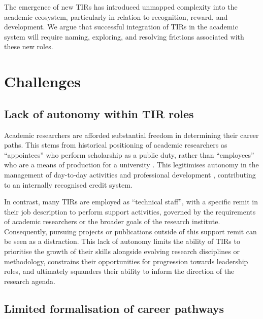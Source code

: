 \documentclass[authordate,meta]{jote-new-article}
\begin{document}
The emergence of new TIRs has introduced unmapped complexity into the academic ecosystem, particularly in relation to recognition, reward, and development. We argue that successful integration of TIRs in the academic system will require naming, exploring, and resolving frictions associated with these new roles.



\section{Challenges}



\subsection{Lack of autonomy within TIR roles}



Academic researchers are afforded substantial freedom in determining their career paths. This stems from historical positioning of academic researchers as “appointees” who perform scholarship as a public duty, rather than “employees” who are a means of production for a university \parencites{Finkin2011}. This legitimises autonomy in the management of day-to-day activities and professional development \parencites{Wolf2021}, contributing to an internally recognised credit system.







In contrast, many TIRs are employed as “technical staff”, with a specific remit in their job description to perform support activities, governed by the requirements of academic researchers or the broader goals of the research institute. Consequently, pursuing projects or publications outside of this support remit can be seen as a distraction. This lack of autonomy limits the ability of TIRs to prioritise the growth of their skills alongside evolving research disciplines or methodology, constrains their opportunities for progression towards leadership roles, and ultimately squanders their ability to inform the direction of the research agenda.



\subsection{Limited formalisation of career pathways}
\end{document}
